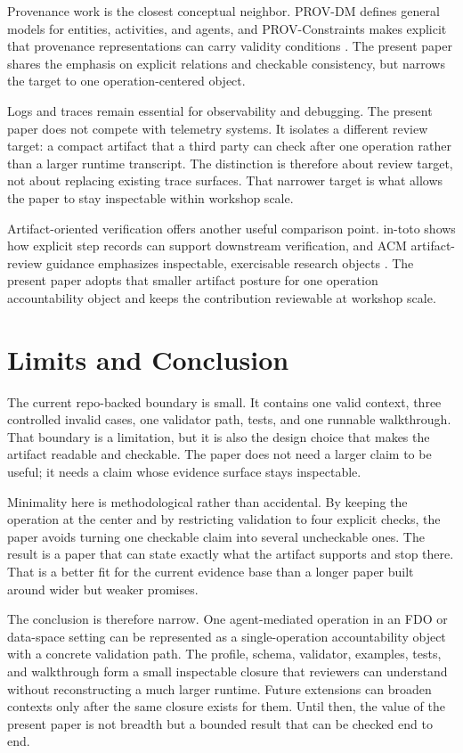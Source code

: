 \documentclass[conference]{IEEEtran}
\begin{document}
Provenance work is the closest conceptual neighbor. PROV-DM defines general models for entities, activities, and agents, and PROV-Constraints makes explicit that provenance representations can carry validity conditions \cite{groth2013provoverview,moreau2013provdm,cheney2013provconstraints}. The present paper shares the emphasis on explicit relations and checkable consistency, but narrows the target to one operation-centered object.

Logs and traces remain essential for observability and debugging. The present paper does not compete with telemetry systems. It isolates a different review target: a compact artifact that a third party can check after one operation rather than a larger runtime transcript. The distinction is therefore about review target, not about replacing existing trace surfaces. That narrower target is what allows the paper to stay inspectable within workshop scale.

Artifact-oriented verification offers another useful comparison point. in-toto shows how explicit step records can support downstream verification, and ACM artifact-review guidance emphasizes inspectable, exercisable research objects \cite{torresarias2019intoto,acm2020artifactbadging}. The present paper adopts that smaller artifact posture for one operation accountability object and keeps the contribution reviewable at workshop scale.

\section{Limits and Conclusion}

The current repo-backed boundary is small. It contains one valid context, three controlled invalid cases, one validator path, tests, and one runnable walkthrough. That boundary is a limitation, but it is also the design choice that makes the artifact readable and checkable. The paper does not need a larger claim to be useful; it needs a claim whose evidence surface stays inspectable.

Minimality here is methodological rather than accidental. By keeping the operation at the center and by restricting validation to four explicit checks, the paper avoids turning one checkable claim into several uncheckable ones. The result is a paper that can state exactly what the artifact supports and stop there. That is a better fit for the current evidence base than a longer paper built around wider but weaker promises.

The conclusion is therefore narrow. One agent-mediated operation in an FDO or data-space setting can be represented as a single-operation accountability object with a concrete validation path. The profile, schema, validator, examples, tests, and walkthrough form a small inspectable closure that reviewers can understand without reconstructing a much larger runtime. Future extensions can broaden contexts only after the same closure exists for them. Until then, the value of the present paper is not breadth but a bounded result that can be checked end to end.

\balance


\end{document}
